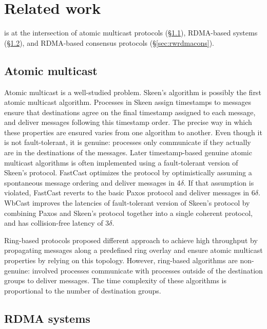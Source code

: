 \section{Related work}
\label{sec:related-work}

\libname is at the intersection of atomic multicast protocols (\S\ref{sec:rwamcast}), 
RDMA-based systems (\S\ref{sec:rwrdmasys}), and RDMA-based consensus protocols (\S\ref{sec:rwrdmacons}).


\subsection{Atomic multicast}
\label{sec:rwamcast}

Atomic multicast is a well-studied problem. Skeen's algorithm
\cite{birman1987reliable} is possibly the first atomic multicast algorithm.
Processes in Skeen assign timestamps to messages ensure that destinations agree
on the final timestamp assigned to each message, and deliver messages following
this timestamp order. The precise way in which these properties are ensured
varies from one algorithm to another. Even though it is not fault-tolerant, it
is genuine: processes only communicate if they actually are in the destinations
of the messages. Later timestamp-based genuine atomic multicast algorithms is
often implemented using a fault-tolerant version of Skeen’s protocol. FastCast
\cite{coelho2017fast} optimizes the protocol by optimistically assuming a
spontaneous message ordering and deliver messages in 4$\delta$. If that
assumption is violated, FastCast reverts to the basic Paxos protocol and
deliver messages in 6$\delta$. WbCast \cite{gotsman2019white} improves the
latencies of fault-tolerant version of Skeen's protocol by combining Paxos and
Skeen’s protocol together into a single coherent protocol, and has
collision-free latency of 3$\delta$.

Ring-based protocols \cite{delporte2000fault, bezerra2015ridge,
marandi2012multi} proposed different approach to achieve high throughput by
propagating messages along a predefined ring overlay and ensure atomic multicast
properties by relying on this topology. However, ring-based algorithms are
non-genuine: involved processes communicate with processes outside of the
destination groups to deliver messages. The time complexity of these algorithms is
proportional to the number of destination groups.

\subsection{RDMA systems}
\label{sec:rwrdmasys}

